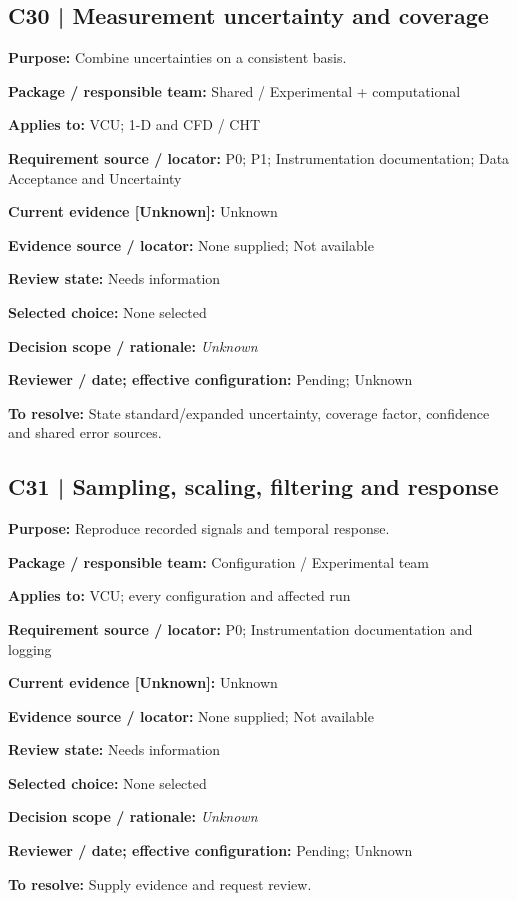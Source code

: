 \documentclass[11pt]{article}
\begin{document}
\par\noindent\begin{minipage}{\textwidth}\small\setlength{\parskip}{2pt}
\subsection*{C30 | Measurement uncertainty and coverage}
\textbf{Purpose:} Combine uncertainties on a consistent basis.\par
\textbf{Package / responsible team:} Shared / Experimental + computational\par
\textbf{Applies to:} VCU; 1-D and CFD / CHT\par
\textbf{Requirement source / locator:} P0; P1; Instrumentation documentation; Data Acceptance and Uncertainty\par
\textbf{Current evidence [Unknown]:} Unknown\par
\textbf{Evidence source / locator:} None supplied; Not available\par
\textbf{Review state:} Needs information\par
\textbf{Selected choice:} None selected\par
\textbf{Decision scope / rationale:} \textit{Unknown}\par
\textbf{Reviewer / date; effective configuration:} Pending; Unknown\par
\textbf{To resolve:} State standard/expanded uncertainty, coverage factor, confidence and shared error sources.\par
\end{minipage}\par\vspace{5pt}
\par\noindent\begin{minipage}{\textwidth}\small\setlength{\parskip}{2pt}
\subsection*{C31 | Sampling, scaling, filtering and response}
\textbf{Purpose:} Reproduce recorded signals and temporal response.\par
\textbf{Package / responsible team:} Configuration / Experimental team\par
\textbf{Applies to:} VCU; every configuration and affected run\par
\textbf{Requirement source / locator:} P0; Instrumentation documentation and logging\par
\textbf{Current evidence [Unknown]:} Unknown\par
\textbf{Evidence source / locator:} None supplied; Not available\par
\textbf{Review state:} Needs information\par
\textbf{Selected choice:} None selected\par
\textbf{Decision scope / rationale:} \textit{Unknown}\par
\textbf{Reviewer / date; effective configuration:} Pending; Unknown\par
\textbf{To resolve:} Supply evidence and request review.\par
\end{minipage}\par\vspace{5pt}
\end{document}
